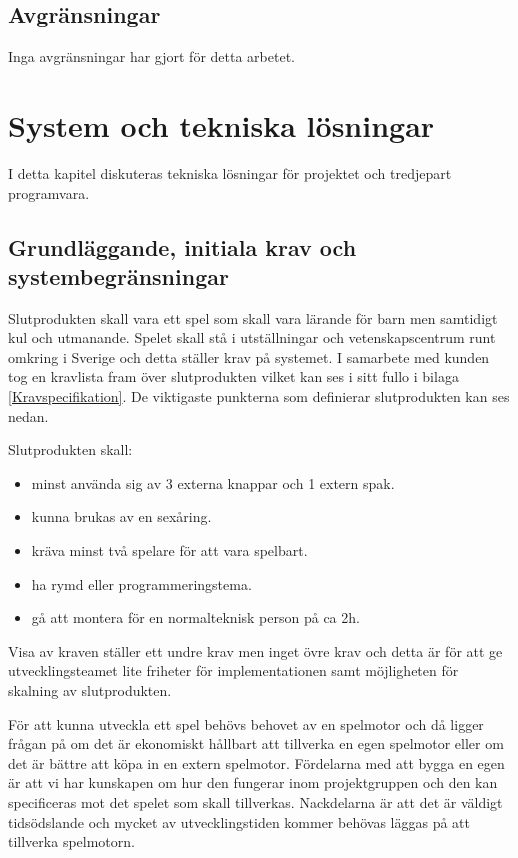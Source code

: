 \documentclass[a4paper,12pt,oneside,final]{extbook}
\begin{document}
\section{Avgränsningar}
Inga avgränsningar har gjort för detta arbetet.


\chapter{System och tekniska lösningar}
I detta kapitel diskuteras tekniska lösningar för projektet och tredjepart programvara.

\section{Grundläggande, initiala krav och systembegränsningar}
Slutprodukten skall vara ett spel som skall vara lärande för barn men samtidigt kul och utmanande. Spelet skall stå i utställningar och vetenskapscentrum runt omkring i Sverige och detta ställer krav på systemet. I samarbete med kunden tog en kravlista fram över slutprodukten vilket kan ses i sitt fullo i bilaga \ref{Kravspecifikation}. De viktigaste punkterna som definierar slutprodukten kan ses nedan.

Slutprodukten skall:
\begin{itemize}
	\item minst använda sig av 3 externa knappar och 1 extern spak.
	\item kunna brukas av en sexåring.
	\item kräva minst två spelare för att vara spelbart.
	\item ha rymd eller programmeringstema.
	\item gå att montera för en normalteknisk person på ca 2h.
\end{itemize}

Visa av kraven ställer ett undre krav men inget övre krav och detta är för att ge utvecklingsteamet lite friheter för implementationen samt möjligheten för skalning av slutprodukten.

För att kunna utveckla ett spel behövs behovet av en spelmotor och då ligger frågan på om det är ekonomiskt hållbart att tillverka en egen spelmotor eller om det är bättre att köpa in en extern spelmotor. Fördelarna med att bygga en egen är att vi har kunskapen om hur den fungerar inom projektgruppen och den kan specificeras mot det spelet som skall tillverkas. Nackdelarna är att det är väldigt tidsödslande och mycket av utvecklingstiden kommer behövas läggas på att tillverka spelmotorn. 
\end{document}
